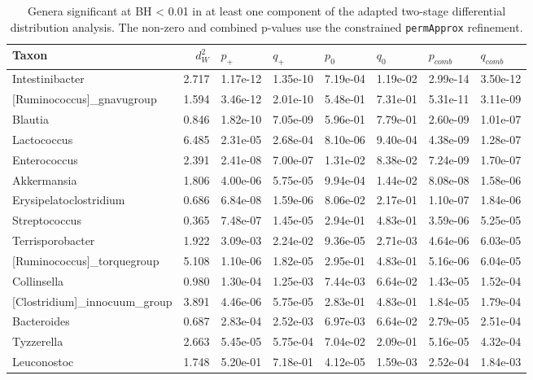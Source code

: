 \begin{table}[!h]
\centering
\caption{\label{tab:application:diff-distribution-two-stage-significant-taxa}Genera significant at BH < 0.01 in at least one component of the adapted two-stage differential distribution analysis. The non-zero and combined p-values use the constrained \texttt{permApprox} refinement.}
\centering
\fontsize{8}{10}\selectfont
\begin{tabular}[t]{lrllllll}
\toprule
Taxon & $d_W^2$ & $p_{+}$ & $q_{+}$ & $p_{0}$ & $q_{0}$ & $p_{comb}$ & $q_{comb}$\\
\midrule
Intestinibacter & 2.717 & 1.17e-12 & 1.35e-10 & 7.19e-04 & 1.19e-02 & 2.99e-14 & 3.50e-12\\
{}[Ruminococcus]_gnavugroup & 1.594 & 3.46e-12 & 2.01e-10 & 5.48e-01 & 7.31e-01 & 5.31e-11 & 3.11e-09\\
Blautia & 0.846 & 1.82e-10 & 7.05e-09 & 5.96e-01 & 7.79e-01 & 2.60e-09 & 1.01e-07\\
Lactococcus & 6.485 & 2.31e-05 & 2.68e-04 & 8.10e-06 & 9.40e-04 & 4.38e-09 & 1.28e-07\\
Enterococcus & 2.391 & 2.41e-08 & 7.00e-07 & 1.31e-02 & 8.38e-02 & 7.24e-09 & 1.70e-07\\
\addlinespace
Akkermansia & 1.806 & 4.00e-06 & 5.75e-05 & 9.94e-04 & 1.44e-02 & 8.08e-08 & 1.58e-06\\
Erysipelatoclostridium & 0.686 & 6.84e-08 & 1.59e-06 & 8.06e-02 & 2.17e-01 & 1.10e-07 & 1.84e-06\\
Streptococcus & 0.365 & 7.48e-07 & 1.45e-05 & 2.94e-01 & 4.83e-01 & 3.59e-06 & 5.25e-05\\
Terrisporobacter & 1.922 & 3.09e-03 & 2.24e-02 & 9.36e-05 & 2.71e-03 & 4.64e-06 & 6.03e-05\\
{}[Ruminococcus]_torquegroup & 5.108 & 1.10e-06 & 1.82e-05 & 2.95e-01 & 4.83e-01 & 5.16e-06 & 6.04e-05\\
\addlinespace
Collinsella & 0.980 & 1.30e-04 & 1.25e-03 & 7.44e-03 & 6.64e-02 & 1.43e-05 & 1.52e-04\\
{}[Clostridium]_innocuum_group & 3.891 & 4.46e-06 & 5.75e-05 & 2.83e-01 & 4.83e-01 & 1.84e-05 & 1.79e-04\\
Bacteroides & 0.687 & 2.83e-04 & 2.52e-03 & 6.97e-03 & 6.64e-02 & 2.79e-05 & 2.51e-04\\
Tyzzerella & 2.663 & 5.45e-05 & 5.75e-04 & 7.04e-02 & 2.09e-01 & 5.16e-05 & 4.32e-04\\
Leuconostoc & 1.748 & 5.20e-01 & 7.18e-01 & 4.12e-05 & 1.59e-03 & 2.52e-04 & 1.84e-03\\

\end{tabular}
\end{table}
